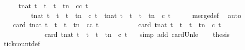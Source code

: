 \begin{isabellebody}
%
\isadelimproof
%
\endisadelimproof
%
\isatagproof
{}\isamarkupfalse%
\ {\isacharminus}\isanewline
\ \ \isamarkupfalse%
\ {\isacartoucheopen}{\isacharbraceleft}t{\isacharcolon}{\isacharcolon}nat{\isachardot}\ t\ {\isasymle}\ t\ {\isasymand}\ t\ {\isacharless}\ tn\ {\isasymand}\ {\isacharparenleft}{\isacharparenleft}c{\isasymoplus}c{\isacharprime}{\isacharparenright}\ t{\isacharparenright}{\isacharbraceright}\isanewline
\ \ \ \ \ \ \ \ {\isacharequal}\ {\isacharbraceleft}t{\isacharcolon}{\isacharcolon}nat{\isachardot}\ t\ {\isasymle}\ t\ {\isasymand}\ t\ {\isacharless}\ tn\ {\isasymand}\ c\ t{\isacharbraceright}\ {\isasymunion}\ {\isacharbraceleft}t{\isacharcolon}{\isacharcolon}nat{\isachardot}\ t\ {\isasymle}\ t\ {\isasymand}\ t\ {\isacharless}\ tn\ {\isasymand}\ c{\isacharprime}\ t{\isacharbraceright}{\isacartoucheclose}\isanewline
\ \ \ \ \isamarkupfalse%
\ merge{\isacharunderscore}def\ \isamarkupfalse%
\ auto\isanewline
\ \ \isamarkupfalse%
\ {\isacartoucheopen}card\ {\isacharbraceleft}t{\isacharcolon}{\isacharcolon}nat{\isachardot}\ t\ {\isasymle}\ t\ {\isasymand}\ t\ {\isacharless}\ tn\ {\isasymand}\ {\isacharparenleft}{\isacharparenleft}c{\isasymoplus}c{\isacharprime}{\isacharparenright}\ t{\isacharparenright}{\isacharbraceright}\isanewline
\ \ \ \ \ \ \ \ \ \ {\isasymle}\ card\ {\isacharbraceleft}t{\isacharcolon}{\isacharcolon}nat{\isachardot}\ t\ {\isasymle}\ t\ {\isasymand}\ t\ {\isacharless}\ tn\ {\isasymand}\ c\ t{\isacharbraceright}\isanewline
\ \ \ \ \ \ \ \ \ \ \ \ {\isacharplus}\ card\ {\isacharbraceleft}t{\isacharcolon}{\isacharcolon}nat{\isachardot}\ t\ {\isasymle}\ t\ {\isasymand}\ t\ {\isacharless}\ tn\ {\isasymand}\ c{\isacharprime}\ t{\isacharbraceright}{\isacartoucheclose}\ \ \isamarkupfalse%
\ {\isacharparenleft}simp\ add{\isacharcolon}\ card{\isacharunderscore}Un{\isacharunderscore}le{\isacharparenright}\isanewline
\ \ \isamarkupfalse%
\ {\isacharquery}thesis\ \isamarkupfalse%
\ tick{\isacharunderscore}count{\isacharunderscore}def\ \isacommand{{\isachardot}}\isamarkupfalse%
\isanewline
{}\isamarkupfalse%

\end{isabellebody}
